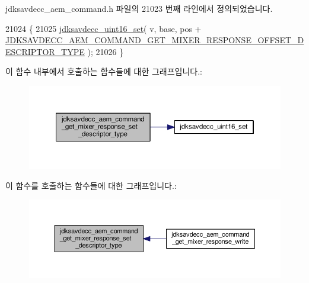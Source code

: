 jdksavdecc\+\_\+aem\+\_\+command.\+h 파일의 21023 번째 라인에서 정의되었습니다.


\begin{DoxyCode}
21024 \{
21025     \hyperlink{group__endian_ga14b9eeadc05f94334096c127c955a60b}{jdksavdecc\_uint16\_set}( v, base, pos + 
      \hyperlink{group__command__get__mixer__response_gae9ce9c8d301514057dab15b3251b83f3}{JDKSAVDECC\_AEM\_COMMAND\_GET\_MIXER\_RESPONSE\_OFFSET\_DESCRIPTOR\_TYPE}
       );
21026 \}
\end{DoxyCode}


이 함수 내부에서 호출하는 함수들에 대한 그래프입니다.\+:
\nopagebreak
\begin{figure}[H]
\begin{center}
\leavevmode
\includegraphics[width=350pt]{group__command__get__mixer__response_ga24e18ece19fc7bf5f98a0cf219742f54_cgraph}
\end{center}
\end{figure}




이 함수를 호출하는 함수들에 대한 그래프입니다.\+:
\nopagebreak
\begin{figure}[H]
\begin{center}
\leavevmode
\includegraphics[width=350pt]{group__command__get__mixer__response_ga24e18ece19fc7bf5f98a0cf219742f54_icgraph}
\end{center}
\end{figure}


